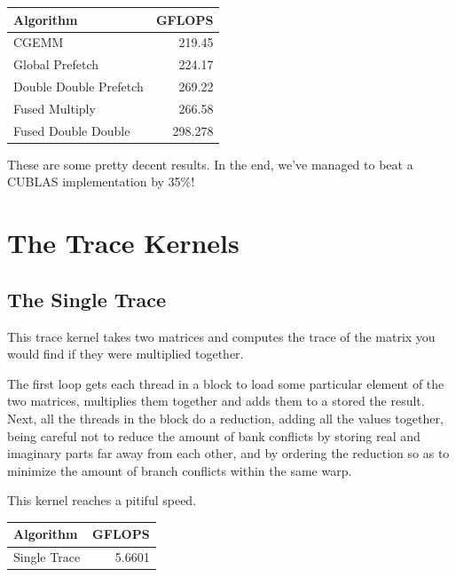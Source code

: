 \documentclass[a4paper,12pt]{report}
\newenvironment{CUDAtiming}%
{\setlength{\extrarowheight}{1.5pt} \begin{center}\begin{tabular}{l|r} Algorithm & GFLOPS\\\hline}%
{\end{tabular}\end{center}}
\begin{document}
\begin{CUDAtiming}
CGEMM & 219.45\\
Global Prefetch & 224.17\\
Double Double Prefetch & 269.22\\
\hline
Fused Multiply & 266.58\\
Fused Double Double & 298.278\\
\end{CUDAtiming}

These are some pretty decent results.
In the end, we've managed to beat a CUBLAS implementation by 35\%!



\section{The Trace Kernels}

\subsection{The Single Trace}
This trace kernel takes two matrices and computes the trace of the matrix you would find if they were multiplied together.

The first loop gets each thread in a block to load some particular element of the two matrices, multiplies them together and adds them to a stored the result.
Next, all the threads in the block do a reduction, adding all the values together, being careful not to reduce the amount of bank conflicts by storing real and imaginary parts far away from each other, and by ordering the reduction so as to minimize the amount of branch conflicts within the same warp.

This kernel reaches a pitiful speed.

\begin{CUDAtiming}
Single Trace & 5.6601
\end{CUDAtiming}
\end{document}
